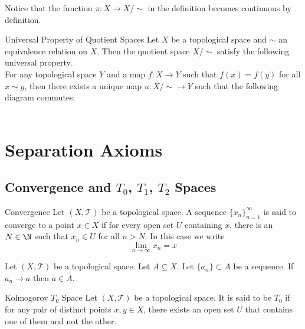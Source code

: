\documentclass[a4paper]{article}
\begin{document}
Notice that the function $\pi:X\to X/\sim$ in the definition becomes continuous by definition. 

\begin{prp}{Universal Property of Quotient Spaces}{} Let $X$ be a topological space and $\sim$ an equivalence relation on $X$. Then the quotient space $X/\sim$ satisfy the following universal property. \\

For any topological space $Y$ and a map $f:X\to Y$ such that $f(x)=f(y)$ for all $x\sim y$, then there exists a unique map $u:X/\sim\to Y$ such that the following diagram commutes: \\
 \\
\end{prp}

\pagebreak
\section{Separation Axioms}
\subsection{Convergence and $T_0$, $T_1$, $T_2$ Spaces}
\begin{defn}{Convergence}{} Let $(X,\mathcal{T})$ be a topological space. A sequence $\{x_n\}_{n=1}^\infty$ is said to converge to a point $x\in X$ if for every open set $U$ containing $x$, there is an $N\in\N$ such that $x_n\in U$ for all $n>N$. In this case we write $$\lim_{n\to\infty}x_n=x$$
\end{defn}

\begin{prp}{}{} Let $(X,\mathcal{T})$ be a topological space. Let $A\subseteq X$. Let $\{a_n\}\subset A$ be a sequence. If $a_n\to a$ then $a\in\overline{A}$. 
\end{prp}

\begin{defn}{Kolmogorov $T_0$ Space}{} Let $(X,\mathcal{T})$ be a topological space. It is said to be $T_0$ if for any pair of distinct points $x,y\in X$, there exists an open set $U$ that contains one of them and not the other. 
\end{defn}
\end{document}
